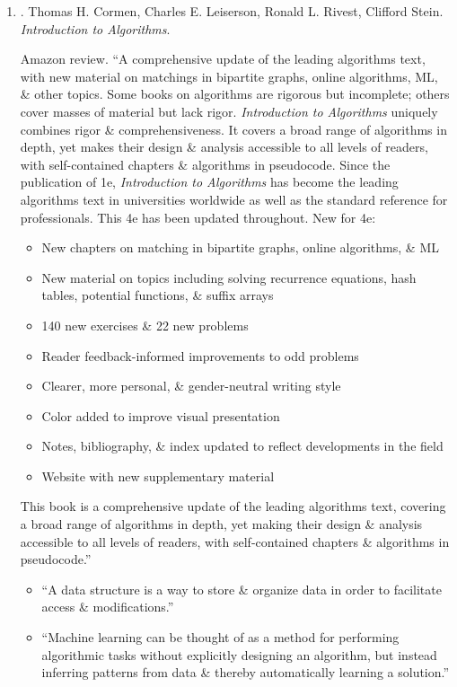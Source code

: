\documentclass{article}
\begin{document}
\begin{enumerate}
	\item \cite{Cormen_Leiserson_Rivest_Stein_algorithm}. {\sc Thomas H. Cormen, Charles E. Leiserson,  Ronald L. Rivest, Clifford Stein}. {\it Introduction to Algorithms}. {}
	
	{\sf Amazon review.} ``A comprehensive update of the leading algorithms text, with new material on matchings in bipartite graphs, online algorithms, ML, \& other topics. Some books on algorithms are rigorous but incomplete; others cover masses of material but lack rigor. {\it Introduction to Algorithms} uniquely combines rigor \& comprehensiveness. It covers a broad range of algorithms in depth, yet makes their design \& analysis accessible to all levels of readers, with self-contained chapters \& algorithms in pseudocode. Since the publication of 1e, {\it Introduction to Algorithms} has become the leading algorithms text in universities worldwide as well as the standard reference for professionals. This 4e has been updated throughout. New for 4e:
	\begin{itemize}
		\item New chapters on matching in bipartite graphs, online algorithms, \& ML
		\item New material on topics including solving recurrence equations, hash tables, potential functions, \& suffix arrays
		\item 140 new exercises \& 22 new problems
		\item Reader feedback-informed improvements to odd problems
		\item Clearer, more personal, \& gender-neutral writing style
		\item Color added to improve visual presentation
		\item Notes, bibliography, \& index updated to reflect developments in the field
		\item Website with new supplementary material
	\end{itemize}
	This book is a comprehensive update of the leading algorithms text, covering a broad range of algorithms in depth, yet making their design \& analysis accessible to all levels of readers, with self-contained chapters \& algorithms in pseudocode.''
	\begin{itemize}
		\item ``A data structure is a way to store \& organize data in order to facilitate access \& modifications.''
		\item ``Machine learning can be thought of as a method for performing algorithmic tasks without explicitly designing an algorithm, but instead inferring patterns from data \& thereby automatically learning a solution.''

\end{itemize}
\end{enumerate}
\end{document}

